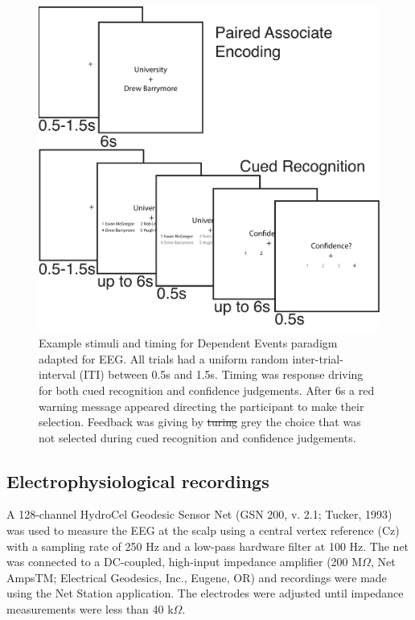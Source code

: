 \documentclass[11pt, titlepage, twoside]{article}
\providecommand{\DIFadd}[1]{{\protect\color{blue}\uwave{#1}}} %
\providecommand{\DIFdel}[1]{{\protect\color{red}\sout{#1}}}                      %
\providecommand{\DIFaddFL}[1]{\DIFadd{#1}} %
\providecommand{\DIFdelFL}[1]{\DIFdel{#1}} %
\providecommand{\DIFaddbeginFL}{} %
\providecommand{\DIFaddendFL}{} %
\providecommand{\DIFdelbeginFL}{} %
\providecommand{\DIFdelendFL}{} %
\begin{document}
\begin{figure}
	\includegraphics[width=.5\textwidth]{figs/deevTask.pdf}
	\caption[EEG Dependent Events Task]{
		Example stimuli and timing for Dependent Events paradigm adapted for EEG.  All trials had a uniform random inter-trial-interval (ITI) between 0.5s and 1.5s.  Timing was response driving for both cued recognition and confidence judgements.  After 6s a red warning message appeared directing the participant to make their selection.  Feedback was giving by \DIFdelbeginFL \DIFdelFL{turing }\DIFdelendFL \DIFaddbeginFL \DIFaddFL{turning }\DIFaddendFL grey the choice that was not selected during cued recognition and confidence judgements.  
	}
	\label{fig:deevTask}
\end{figure}



\subsection{Electrophysiological recordings}
A 128-channel HydroCel Geodesic Sensor Net (GSN 200, v. 2.1; Tucker, 1993) was used to measure the EEG at the scalp using a central vertex reference (Cz) with a sampling rate of 250 Hz and a low-pass hardware filter at 100 Hz. The net was connected to a DC-coupled, high-input impedance amplifier (200 M$\Omega$, Net AmpsTM; Electrical Geodesics, Inc., Eugene, OR) and recordings were made using the Net Station application. The electrodes were adjusted until impedance measurements were less than 40 k$\Omega$.
\end{document}
